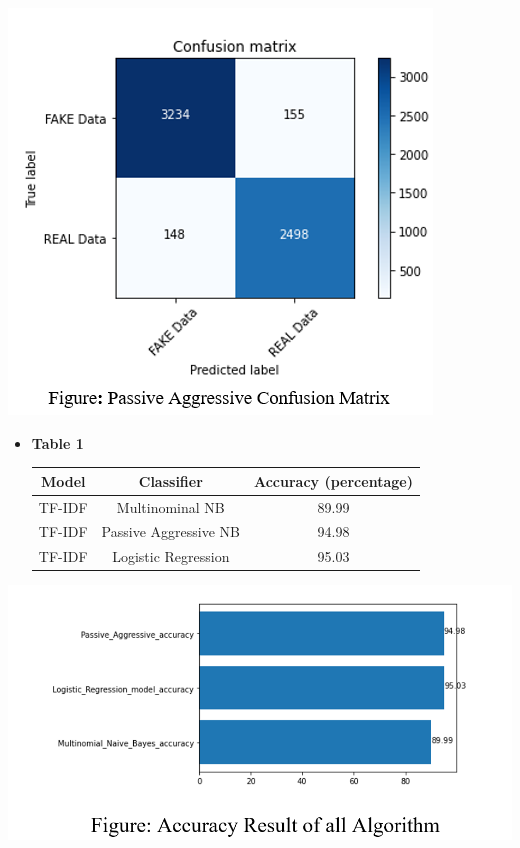 \documentclass[conference]{IEEEtran}
\begin{document}
\includegraphics[scale=0.70]{figH.png}


\begin{itemize}
\item \textbf{Table 1}
\begin{table}[ht]
	\centering
	\begin{tabular}{|c|c|c|}
	\hline
	Model & Classifier & Accuracy (percentage) \\
	\hline
	TF-IDF & Multinominal NB & 89.99 \\
	\hline
	TF-IDF & Passive Aggressive NB & 94.98 \\
	\hline
	TF-IDF & Logistic Regression & 95.03 \\
	\hline
	\end{tabular}	
\end{table}
\end{itemize}


\includegraphics[scale=0.35]{figI.png}
\end{document}
